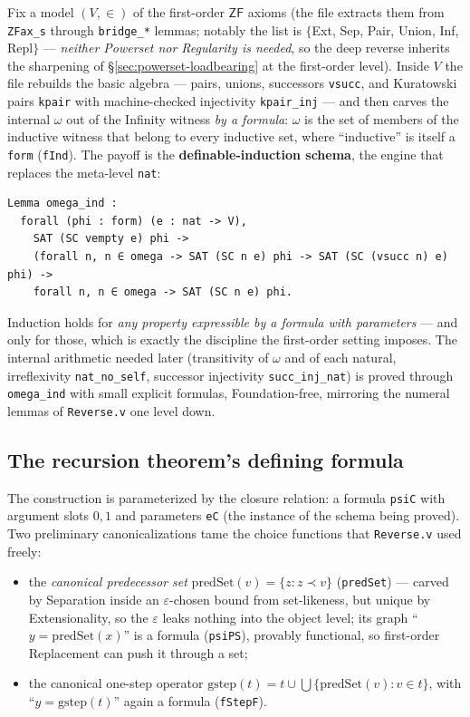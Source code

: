 \documentclass[11pt]{article}
\theoremstyle{plain}
\theoremstyle{definition}
\newcommand{\ZF}{\mathsf{ZF}}
\renewcommand{\ZF}{\textsf{ZF}}
\newcommand{\cq}[1]{\lstinline[basicstyle=\ttfamily]|#1|}
\begin{document}
Fix a model $(V,\in)$ of the first-order $\ZF$ axioms (the file extracts them
from \cq{ZFax_s} through \cq{bridge_*} lemmas; notably the list is
$\{$Ext, Sep, Pair, Union, Inf, Repl$\}$ --- \emph{neither Powerset nor
Regularity is needed}, so the deep reverse inherits the sharpening of
\S\ref{sec:powerset-loadbearing} at the first-order level). Inside $V$ the file
rebuilds the basic algebra --- pairs, unions, successors \cq{vsucc}, and
Kuratowski pairs \cq{kpair} with machine-checked injectivity \cq{kpair_inj} ---
and then carves the internal $\omega$ out of the Infinity witness \emph{by a
formula}: $\omega$ is the set of members of the inductive witness that belong to
every inductive set, where ``inductive'' is itself a \cq{form} (\cq{fInd}). The
payoff is the \textbf{definable-induction schema}, the engine that replaces the
meta-level \cq{nat}:

\begin{lstlisting}
Lemma omega_ind :
  forall (phi : form) (e : nat -> V),
    SAT (SC vempty e) phi ->
    (forall n, n ∈ omega -> SAT (SC n e) phi -> SAT (SC (vsucc n) e) phi) ->
    forall n, n ∈ omega -> SAT (SC n e) phi.
\end{lstlisting}

Induction holds for \emph{any property expressible by a formula with
parameters} --- and only for those, which is exactly the discipline the
first-order setting imposes. The internal arithmetic needed later
(transitivity of $\omega$ and of each natural, irreflexivity
\cq{nat_no_self}, successor injectivity \cq{succ_inj_nat}) is proved through
\cq{omega_ind} with small explicit formulas, Foundation-free, mirroring the
numeral lemmas of \texttt{Reverse.v} one level down.

\subsection{The recursion theorem's defining formula}

The construction is parameterized by the closure relation: a formula \cq{psiC}
with argument slots $0,1$ and parameters \cq{eC} (the instance of the schema
being proved). Two preliminary canonicalizations tame the choice functions that
\texttt{Reverse.v} used freely:

\begin{itemize}[leftmargin=1.4em]
\item the \emph{canonical predecessor set}
  $\mathrm{predSet}(v) = \{z : z \prec v\}$ (\cq{predSet})
  --- carved by Separation inside an $\varepsilon$-chosen bound from
  set-likeness, but unique by Extensionality, so the $\varepsilon$ leaks nothing
  into the object level; its graph ``$y = \mathrm{predSet}(x)$'' is a formula
  (\cq{psiPS}), provably functional, so first-order Replacement can push it
  through a set;
\item the canonical one-step operator
  $\mathrm{gstep}(t) = t \cup \bigcup\{\mathrm{predSet}(v) : v \in t\}$, with
  ``$y = \mathrm{gstep}(t)$'' again a formula (\cq{fStepF}).
\end{itemize}
\end{document}
